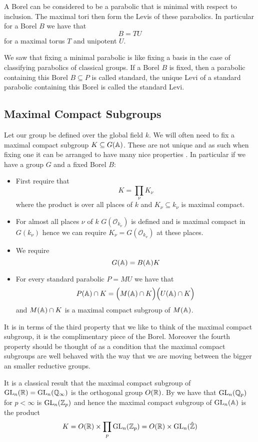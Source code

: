     
    A Borel can be considered to be a parabolic that is minimal with respect to inclusion. The maximal tori then form the Levis of these parabolics. In particular for a Borel \(B\) we have that 
    \[B = TU\]
    for a maximal torus \(T\) and unipotent \(U\).

    We saw that fixing a minimal parabolic is like fixing a basis in the case of classifying parabolics of classical groups. If a Borel \(B\) is fixed, then a parabolic containing this Borel \(B\subseteq P\) is called standard, the unique Levi of a standard parabolic containing this Borel is called the standard Levi.

    \subsection{Maximal Compact Subgroups}
    Let our group be defined over the global field \(k\). We will often need to fix a maximal compact subgroup \(K\subseteq G(\A)\). These are not unique and as such when fixing one it can be arranged to have many nice properties \cite[I.1.4]{moeglinSpectralDecompositionEisenstein1995}. In particular if we have a group \(G\) and a fixed Borel \(B\):
    \begin{itemize}
        \item First require that 
        \[K = \prod_\nu K_\nu\]
        where the product is over all places of \(k\) and \(K_\nu\subseteq k_\nu\) is maximal compact. 
        \item For almost all places \(\nu\) of \(k\) \(G(\mathcal{O}_{k_\nu})\) is defined and is maximal compact in \(G(k_\nu)\) hence we can require \(K_\nu = G(\mathcal{O}_{k_\nu})\) at these places. 
        \item We require 
        \[G(\A) = B(\A)K\]
        \item For every standard parabolic \(P = MU\) we have that 
        \[P(\A)\cap K = \Bigl( M(\A)\cap K \Bigr) \Bigl( U(\A)\cap K \Bigr)\]
        and \(M(\A)\cap K\) is a maximal compact subgroup of \(M(\A)\).
    \end{itemize}
     It is in terms of the third property that we like to think of the maximal compact subgroup, it is the complimentary piece of the Borel. Moreover the fourth property should be thought of as a condition that the maximal compact subgroups are well behaved with the way that we are moving between the bigger an smaller reductive groups.
    
    \begin{example}[\(\GL_n(\A_\Q)\)]
        It is a classical result that the maximal compact subgroup of \(\GL_n(\R) = \GL_n(\Q_\infty)\) is the orthogonal group \(O(\R)\). By \cite[II.IV.A1]{serreLieAlgebrasLie1992} we have that \(\GL_n(\Q_p)\) for \(p<\infty\) is \(\GL_n(\Z_p)\) and hence the maximal compact subgroup of \(\GL_n(\A)\) is the product
        \[K = O(\R) \times \prod_p \GL_n(\Z_p) = O(\R) \times \GL_n(\hat{\Z})\]
    \end{example}